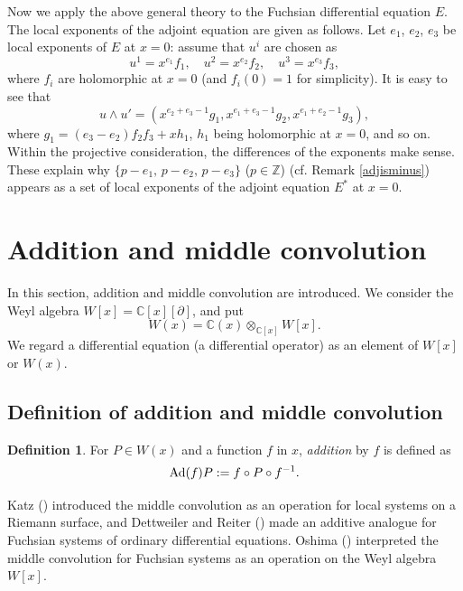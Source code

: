\documentclass[a4paper,12pt]{article}
\theoremstyle{definition}
\newtheorem{dfn}[thm]{Definition}
\theoremstyle{remark}
\numberwithin{equation}{section} %
\begin{document}
Now we apply the above general theory to the Fuchsian differential
equation $E$. The local exponents of the adjoint equation are given as follows.
Let $e_1$, $e_2$, $e_3$ be local exponents of $E$ at $x=0$: assume that
$u^i$ are chosen as
  \[ u^1=x^{e_1}f_1,\quad u^2=x^{e_2}f_2,\quad u^3=x^{e_3}f_3,\]
where $f_i$ are holomorphic at $x=0$ (and $f_i(0)=1$ for simplicity).
It is easy to see that
  \[u\wedge u' = ( x^{e_2+e_3-1}g_1, x^{e_1+e_3-1}g_2,x^{e_1+e_2-1}g_3),\]
where $g_1=(e_3-e_2)f_2f_3+ xh_1$, $h_1$ being holomorphic at $x=0$, and so on. 
Within the projective consideration, the differences of the exponents make sense.
These explain why $\{p-e_1,\, p-e_2,\, p-e_3\}$ ($p\in \mathbb{Z}$)
  (cf. Remark \ref{adjisminus}) appears as a set of local exponents of the adjoint equation $E^*$ at $x=0$.


\section{Addition and middle convolution}\label{GenAdd}\secttoc
In this section, addition and middle convolution are introduced.
We consider the Weyl algebra $W[x]=\mathbb{C}[x][\partial]$,
and put
$$
 W(x)=\mathbb{C}(x)\otimes_{\mathbb{C}[x]}W[x]. 
$$
We regard a differential equation (a differential operator) as an element
of $W[x]$ or $W(x)$.

\subsection{Definition of addition and middle convolution}
\begin{dfn}\label{GenAddAdd}
 For $P\in W(x)$ and a function $f$ in $x$, {\it addition} by $f$ is defined as
 $${\rm Ad}(f)P:=f\circ P\circ f^{-1}.$$
\end{dfn}

Katz (\cite{katz}) introduced the middle convolution as an operation for local systems on a Riemann surface, and Dettweiler and Reiter (\cite{DR}) made an additive analogue for Fuchsian systems of ordinary differential equations.
Oshima (\cite{Osh,Oshi2}) interpreted the middle convolution for Fuchsian systems as an operation on the Weyl algebra $W[x]$.
\end{document}
